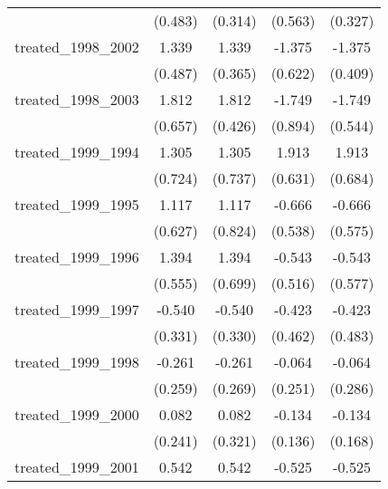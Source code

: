 {\begin{tabular}{l*{4}{c}}
            &     (0.483)         &     (0.314)         &     (0.563)         &     (0.327)         \\
[1em]
treated\_1998\_2002&       1.339\sym{**} &       1.339\sym{***}&      -1.375\sym{*}  &      -1.375\sym{***}\\
            &     (0.487)         &     (0.365)         &     (0.622)         &     (0.409)         \\
[1em]
treated\_1998\_2003&       1.812\sym{**} &       1.812\sym{***}&      -1.749         &      -1.749\sym{**} \\
            &     (0.657)         &     (0.426)         &     (0.894)         &     (0.544)         \\
[1em]
treated\_1999\_1994&       1.305         &       1.305         &       1.913\sym{**} &       1.913\sym{**} \\
            &     (0.724)         &     (0.737)         &     (0.631)         &     (0.684)         \\
[1em]
treated\_1999\_1995&       1.117         &       1.117         &      -0.666         &      -0.666         \\
            &     (0.627)         &     (0.824)         &     (0.538)         &     (0.575)         \\
[1em]
treated\_1999\_1996&       1.394\sym{*}  &       1.394\sym{*}  &      -0.543         &      -0.543         \\
            &     (0.555)         &     (0.699)         &     (0.516)         &     (0.577)         \\
[1em]
treated\_1999\_1997&      -0.540         &      -0.540         &      -0.423         &      -0.423         \\
            &     (0.331)         &     (0.330)         &     (0.462)         &     (0.483)         \\
[1em]
treated\_1999\_1998&      -0.261         &      -0.261         &      -0.064         &      -0.064         \\
            &     (0.259)         &     (0.269)         &     (0.251)         &     (0.286)         \\
[1em]
treated\_1999\_2000&       0.082         &       0.082         &      -0.134         &      -0.134         \\
            &     (0.241)         &     (0.321)         &     (0.136)         &     (0.168)         \\
[1em]
treated\_1999\_2001&       0.542         &       0.542         &      -0.525\sym{**} &      -0.525\sym{**} \\

\end{tabular}}

